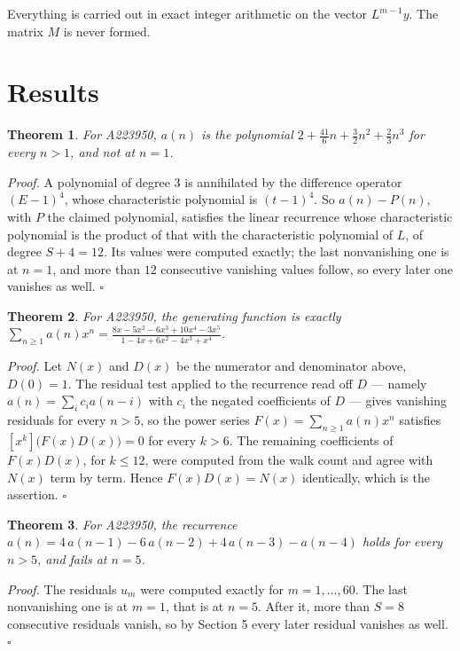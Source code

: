 \documentclass[11pt]{article}
\newtheorem{theorem}{Theorem}
\theoremstyle{definition}
\begin{document}
Everything is carried out in exact integer arithmetic on the vector $L^{m-1}y$. The matrix $M$ is never formed.

\section{Results}

\begin{theorem} For A223950, $a(n)$ is the polynomial $2 + \frac{41}{6}n + \frac{3}{2}n^{2} + \frac{2}{3}n^{3}$ for every $n > 1$, and not at $n = 1$.\end{theorem}

{\itshape Proof.} A polynomial of degree $3$ is annihilated by the difference operator $(E-1)^{4}$, whose characteristic polynomial is $(t-1)^{4}$. So $a(n) - P(n)$, with $P$ the claimed polynomial, satisfies the linear recurrence whose characteristic polynomial is the product of that with the characteristic polynomial of $L$, of degree $S + 4 = 12$. Its values were computed exactly; the last nonvanishing one is at $n = 1$, and more than $12$ consecutive vanishing values follow, so every later one vanishes as well. $\square$

\begin{theorem} For A223950, the generating function is exactly $\sum_{n\ge 1} a(n)x^n = \frac{8x - 5x^{2} - 6x^{3} + 10x^{4} - 3x^{5}}{1 - 4x + 6x^{2} - 4x^{3} + x^{4}}$.\end{theorem}

{\itshape Proof.} Let $N(x)$ and $D(x)$ be the numerator and denominator above, $D(0)=1$. The residual test applied to the recurrence read off $D$ --- namely $a(n) = \sum_i c_i a(n-i)$ with $c_i$ the negated coefficients of $D$ --- gives vanishing residuals for every $n > 5$, so the power series $F(x)=\sum_{n\ge 1}a(n)x^n$ satisfies $[x^k]\bigl(F(x)D(x)\bigr) = 0$ for every $k > 6$. The remaining coefficients of $F(x)D(x)$, for $k \le 12$, were computed from the walk count and agree with $N(x)$ term by term. Hence $F(x)D(x) = N(x)$ identically, which is the assertion. $\square$

\begin{theorem} For A223950, the recurrence $a(n) = 4\,a(n-1) - 6\,a(n-2) + 4\,a(n-3) - a(n-4)$ holds for every $n > 5$, and fails at $n = 5$.\end{theorem}

{\itshape Proof.} The residuals $u_m$ were computed exactly for $m = 1,\dots,60$. The last nonvanishing one is at $m = 1$, that is at $n = 5$. After it, more than $S = 8$ consecutive residuals vanish, so by Section 5 every later residual vanishes as well. $\square$
\end{document}
